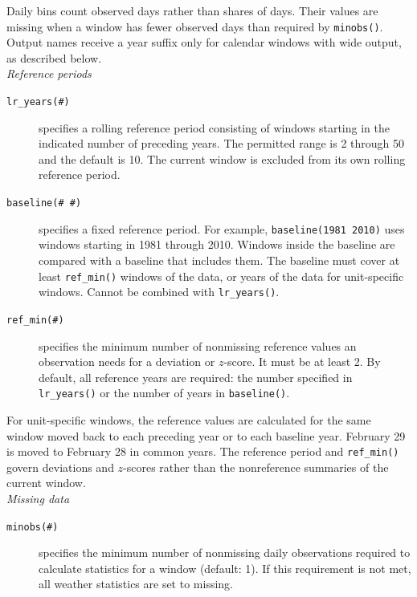 \noindent Daily bins count observed days rather than shares of days. Their values are missing when a window has fewer observed days than required by \texttt{minobs()}. Output names receive a year suffix only for calendar windows with wide output, as described below. \\ 

\noindent\textit{Reference periods}

\begin{description}
	\item[\texttt{lr\_years(\#)}] specifies a rolling reference period consisting of windows starting in the indicated number of preceding years. The permitted range is 2 through 50 and the default is 10. The current window is excluded from its own rolling reference period.
	\item[\texttt{baseline(\# \#)}] specifies a fixed reference period. For example, \texttt{baseline(1981 2010)} uses windows starting in 1981 through 2010. Windows inside the baseline are compared with a baseline that includes them. The baseline must cover at least \texttt{ref\_min()} windows of the data, or years of the data for unit-specific windows. Cannot be combined with \texttt{lr\_years()}.
	\item[\texttt{ref\_min(\#)}] specifies the minimum number of nonmissing reference values an observation needs for a deviation or $z$-score. It must be at least 2. By default, all reference years are required: the number specified in \texttt{lr\_years()} or the number of years in \texttt{baseline()}.
\end{description}

\noindent For unit-specific windows, the reference values are calculated for the same window moved back to each preceding year or to each baseline year. February 29 is moved to February 28 in common years. The reference period and \texttt{ref\_min()} govern deviations and $z$-scores rather than the nonreference summaries of the current window. \\

\noindent\textit{Missing data}

\begin{description}
    \item[\texttt{minobs(\#)}] specifies the minimum number of nonmissing daily observations required to calculate statistics for a window (default: 1). If this requirement is not met, all weather statistics are set to missing.
\end{description}

